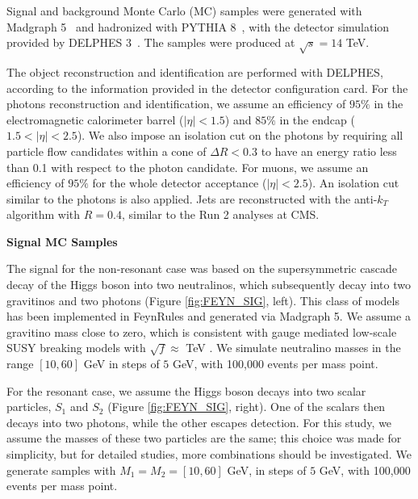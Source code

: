 Signal and background Monte Carlo (MC) samples were generated with Madgraph 5~\cite{madgraph} and hadronized with PYTHIA 8~\cite{pythia}, with the detector simulation provided by DELPHES 3~\cite{delphes}.
The samples were produced at $\sqrt{s} = 14$ TeV.

The object reconstruction and identification are performed with DELPHES, according to the information provided in the detector configuration card. For the photons reconstruction and identification, we assume an efficiency of $95\%$ in the electromagnetic calorimeter barrel ($|\eta| < 1.5$) and $85\%$ in the endcap ($1.5 < |\eta| < 2.5$). We also impose an isolation cut on the photons by requiring all particle flow candidates within a cone of $\Delta R < 0.3$ to have an energy ratio less than 0.1 with respect to the photon candidate. For muons, we assume an efficiency of $95\%$ for the whole detector acceptance ($|\eta| < 2.5$). An isolation cut similar to the photons is also applied. Jets are reconstructed with the anti-$k_T$ algorithm with $R = 0.4$, similar to the Run 2 analyses at CMS.

\vspace{0.2cm} \textbf{Signal MC Samples}

The signal for the non-resonant case was based on the supersymmetric cascade decay of the Higgs boson into two neutralinos, which subsequently decay into two gravitinos and two photons (Figure \ref{fig:FEYN_SIG}, left). This class of models has been implemented in FeynRules \cite{Christensen:2013aua} and generated via Madgraph 5. We assume a gravitino mass close to zero, which is consistent with gauge mediated low-scale SUSY breaking models with $\sqrt{f} \approx$ TeV \cite{Petersson:2012dp}. We simulate neutralino masses in the range $[10,60]$ GeV in steps of $5$ GeV, with 100,000 events per mass point.

For the resonant case, we assume the Higgs boson decays into two scalar particles, $S_1$ and $S_2$ (Figure \ref{fig:FEYN_SIG}, right). One of the scalars then decays into two photons, while the other escapes detection. For this study, we assume the masses of these two particles are the same; this choice was made for simplicity, but for detailed studies, more combinations should be investigated. We generate samples with $M_{1} = M_{2} = [10,60]$ GeV, in steps of $5$ GeV, with 100,000 events per mass point.

